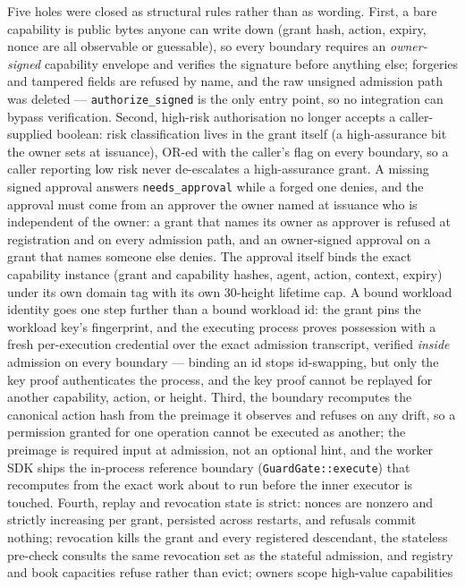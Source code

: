 \documentclass{article}
\begin{document}
Five holes were closed as structural rules rather than as wording. First, a
bare capability is public bytes anyone can write down (grant hash, action,
expiry, nonce are all observable or guessable), so every boundary requires an
\emph{owner-signed} capability envelope and verifies the signature before
anything else; forgeries and tampered fields are refused by name, and the raw
unsigned admission path was deleted --- \texttt{authorize\_signed} is the
only entry point, so no integration can bypass verification. Second,
high-risk authorisation no longer accepts a caller-supplied boolean: risk
classification lives in the grant itself (a high-assurance bit the owner sets
at issuance), OR-ed with the caller's flag on every boundary, so a caller
reporting low risk never de-escalates a high-assurance grant. A missing signed
approval answers \texttt{needs\_approval} while a forged one denies, and the
approval must come from an approver the owner named at issuance who is
independent of the owner: a grant that names its owner as approver is refused
at registration and on every admission path, and an owner-signed approval on
a grant that names someone else denies. The approval itself binds the exact
capability instance (grant and capability hashes, agent, action, context,
expiry) under its own domain tag with its own 30-height lifetime cap. A bound
workload identity goes one step further than a bound workload id: the grant
pins the workload key's fingerprint, and the executing process proves
possession with a fresh per-execution credential over the exact admission
transcript, verified \emph{inside} admission on every boundary --- binding an
id stops id-swapping, but only the key proof authenticates the process, and
the key proof cannot be replayed for another capability, action, or height.
Third, the boundary recomputes the canonical action hash from the preimage it
observes and refuses on any drift, so a permission granted for one operation
cannot be executed as another; the preimage is required input at admission,
not an optional hint, and the worker SDK ships the in-process reference
boundary (\texttt{GuardGate::execute}) that recomputes from the exact work
about to run before the inner executor is touched. Fourth, replay and
revocation state is strict: nonces are nonzero and strictly increasing per
grant, persisted across restarts, and refusals commit nothing; revocation
kills the grant and every registered descendant, the stateless pre-check
consults the same revocation set as the stateful admission, and registry and
book capacities refuse rather than evict; owners scope high-value capabilities
\end{document}
